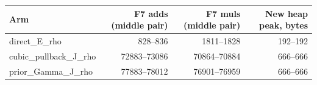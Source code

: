\begin{tabular}{lrrr}
Arm & F7 adds (middle pair) & F7 muls (middle pair) & New heap peak, bytes \\
\hline
direct\_E\_rho & 828--836 & 1811--1828 & 192--192 \\
cubic\_pullback\_J\_rho & 72883--73086 & 70864--70884 & 666--666 \\
prior\_Gamma\_J\_rho & 77883--78012 & 76901--76959 & 666--666 \\
\end{tabular}
